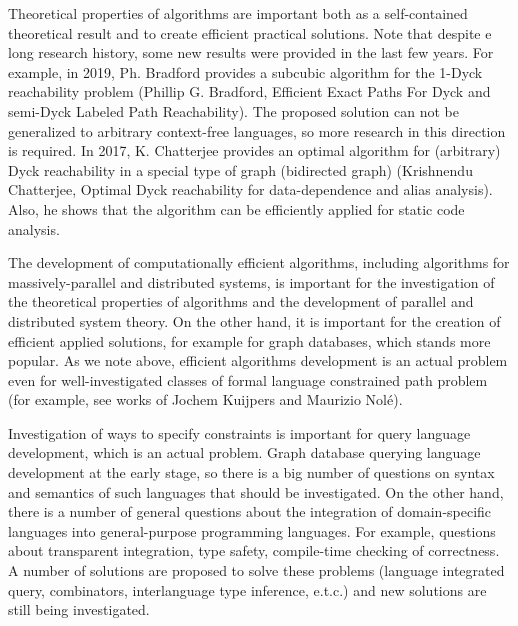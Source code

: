 \documentclass[12pt]{article}  %
\theoremstyle{remark}
\begin{document}
Theoretical properties of algorithms are important both as a self-contained theoretical result and to create efficient practical solutions.
Note that despite e long research history, some new results were provided in the last few years. For example, in 2019, Ph. Bradford provides a subcubic algorithm for the 1-Dyck reachability problem (Phillip G. Bradford, Efficient Exact Paths For Dyck and semi-Dyck Labeled Path Reachability). The proposed solution can not be generalized to arbitrary context-free languages, so more research in this direction is required.
In 2017, K. Chatterjee provides an optimal algorithm for (arbitrary) Dyck reachability in a special type of graph (bidirected graph) (Krishnendu Chatterjee, Optimal Dyck reachability for data-dependence and alias analysis). Also, he shows that the algorithm can be efficiently applied for static code analysis.

The development of computationally efficient algorithms, including algorithms for massively-parallel and distributed systems, is important for the investigation of the theoretical properties of algorithms and the development of parallel and distributed system theory. On the other hand, it is important for the creation of efficient applied solutions, for example for graph databases, which stands more popular. As we note above, efficient algorithms development is an actual problem even for well-investigated classes of formal language constrained path problem (for example, see works of Jochem Kuijpers and Maurizio Nolé).

Investigation of ways to specify constraints is important for query language development, which is an actual problem.
Graph database querying language development at the early stage, so there is a big number of questions on syntax and semantics of such languages that should be investigated. On the other hand, there is a number of general questions about the integration of domain-specific languages into general-purpose programming languages. For example, questions about transparent integration, type safety, compile-time checking of correctness. A number of solutions are proposed to solve these problems (language integrated query, combinators, interlanguage type inference, e.t.c.) and new solutions are still being investigated.
\end{document}
